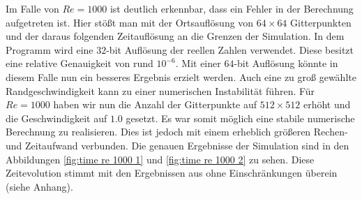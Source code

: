 		Im Falle von $Re = 1000$ ist deutlich erkennbar, dass ein Fehler in der Berechnung aufgetreten ist.
		Hier stößt man mit der Ortsauflösung von $64\times64$ Gitterpunkten und der daraus folgenden Zeitauflösung an die Grenzen der Simulation.
		In dem Programm wird eine $32$-bit Auflösung der reellen Zahlen verwendet.
		Diese besitzt eine relative Genauigkeit von rund $10^{-6}$.
		Mit einer $64$-bit Auflösung könnte in diesem Falle nun ein besseres Ergebnis erzielt werden.
		Auch eine zu groß gewählte Randgeschwindigkeit kann zu einer numerischen Instabilität führen.
		Für $Re=1000$ haben wir nun die Anzahl der Gitterpunkte auf $512\times 512$ erhöht und die Geschwindigkeit auf $1.0$ gesetzt.
		Es war somit möglich eine stabile numerische Berechnung zu realisieren.
		Dies ist jedoch mit einem erheblich größeren Rechen- und Zeitaufwand verbunden.
		Die genauen Ergebnisse der Simulation sind in den Abbildungen \ref{fig:time re 1000 1} und \ref{fig:time re 1000 2} zu sehen.
		Diese Zeitevolution stimmt mit den Ergebnissen aus \cite{nsfd} ohne Einschränkungen überein (siehe Anhang).

